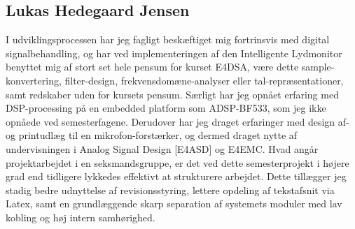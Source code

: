 \subsection*{Lukas Hedegaard Jensen}

I udviklingsprocessen har jeg fagligt beskæftiget mig fortrinsvis med digital signalbehandling, og har ved implementeringen af den Intelligente Lydmonitor benyttet mig af stort set hele pensum for kurset E4DSA, være dette sample-konvertering, filter-design, frekvensdomæne-analyser eller tal-repræsentationer, samt redskaber uden for kursets pensum. Særligt har jeg opnået erfaring med DSP-processing på en embedded platform som ADSP-BF533, som jeg ikke opnåede ved semesterfagene. Derudover har jeg draget erfaringer med design af- og printudlæg til en mikrofon-forstærker, og dermed draget nytte af undervisningen i Analog Signal Design [E4ASD] og E4EMC. Hvad angår projektarbejdet i en seksmandsgruppe, er det ved dette semesterprojekt i højere grad end tidligere lykkedes effektivt at strukturere arbejdet. Dette tillægger jeg stadig bedre udnyttelse af revisionsstyring, lettere opdeling af tekstafsnit via Latex, samt en grundlæggende skarp separation af systemets moduler med lav kobling og høj intern samhørighed.